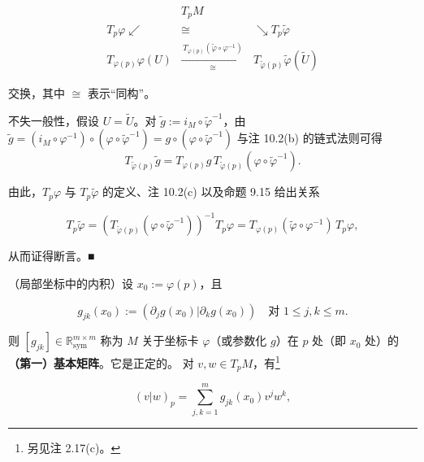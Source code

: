 \begin{remark}
\begin{items}
\begin{equation*}
\begin{array}{ccc} & T_{p}M & \\ T_{p}\varphi \swarrow & \cong & \searrow T_{p}\tilde{\varphi} \\ T_{\varphi(p)}\varphi(U) & \xrightarrow[\cong]{\ T_{\varphi(p)}(\tilde{\varphi}\circ\varphi^{-1})\ } & T_{\tilde{\varphi}(p)}\tilde{\varphi}(\tilde{U}) \end{array}
\end{equation*}

交换，其中 $ \cong $ 表示“同构”。

\proofhead
不失一般性，假设 $ U = \tilde{U} $。对 $ \tilde{g} := i_{M}\circ\tilde{\varphi}^{-1} $，由 $ \tilde{g} = (i_{M}\circ\varphi^{-1})\circ(\varphi\circ\tilde{\varphi}^{-1}) = g\circ(\varphi\circ\tilde{\varphi}^{-1}) $ 与注 10.2(b) 的链式法则可得
\[
T_{\tilde{\varphi}(p)}\tilde{g} = T_{\varphi(p)}g\,T_{\tilde{\varphi}(p)}(\varphi\circ\tilde{\varphi}^{-1}) .
\]

由此，$ T_{p}\varphi $ 与 $ T_{p}\tilde{\varphi} $ 的定义、注 10.2(c) 以及命题 9.15 给出关系

\[
T_{p}\tilde{\varphi} = \left(T_{\tilde{\varphi}(p)}(\varphi\circ\tilde{\varphi}^{-1})\right)^{-1}T_{p}\varphi = T_{\varphi(p)}(\tilde{\varphi}\circ\varphi^{-1})\,T_{p}\varphi ,
\]

从而证得断言。\nobreak\hspace{0.35em}■

\end{items}


\begin{items}
\item[（e）]

（局部坐标中的内积）设 $ x_{0} := \varphi(p) $，且

\[
g_{jk}(x_{0}) := \left(\partial_{j}g(x_{0})\big|\partial_{k}g(x_{0})\right) \quad \text{对 } 1 \le j,k \le m .
\]

则 $ [g_{jk}] \in \mathbb{R}^{m\times m}_{\mathrm{sym}} $ 称为 $ M $ 关于坐标卡 $ \varphi $（或参数化 $ g $）在 $ p $ 处（即 $ x_{0} $ 处）的\textbf{（第一）基本矩阵}。它是正定的。
对 $ v,w \in T_{p}M $，有\footnote{另见注 2.17(c)。}

\begin{equation}
(v|w)_{p} = \sum_{j,k=1}^{m}g_{jk}(x_{0})v^{j}w^{k} ,\tag{10.1}
\end{equation}


\end{items}
\end{remark}
